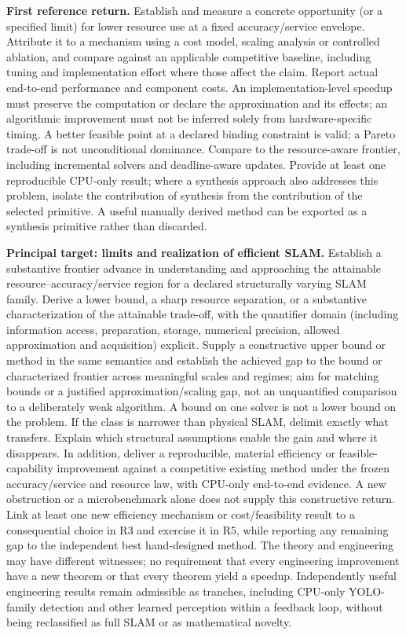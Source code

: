 \documentclass[11pt,letterpaper]{article}
\begin{document}
\textbf{First reference return.} Establish and measure a concrete opportunity (or a specified limit) for lower resource use at a fixed accuracy/service envelope. Attribute it to a mechanism using a cost model, scaling analysis or controlled ablation, and compare against an applicable competitive baseline, including tuning and implementation effort where those affect the claim. Report actual end-to-end performance and component costs. An implementation-level speedup must preserve the computation or declare the approximation and its effects; an algorithmic improvement must not be inferred solely from hardware-specific timing. A better feasible point at a declared binding constraint is valid; a Pareto trade-off is not unconditional dominance. Compare to the resource-aware frontier, including incremental solvers and deadline-aware updates. Provide at least one reproducible CPU-only result; where a synthesis approach also addresses this problem, isolate the contribution of synthesis from the contribution of the selected primitive. A useful manually derived method can be exported as a synthesis primitive rather than discarded.

\textbf{Principal target: limits and realization of efficient SLAM.} Establish a substantive frontier advance in understanding and approaching the attainable resource--accuracy/service region for a declared structurally varying SLAM family. Derive a lower bound, a sharp resource separation, or a substantive characterization of the attainable trade-off, with the quantifier domain (including information access, preparation, storage, numerical precision, allowed approximation and acquisition) explicit. Supply a constructive upper bound or method in the same semantics and establish the achieved gap to the bound or characterized frontier across meaningful scales and regimes; aim for matching bounds or a justified approximation/scaling gap, not an unquantified comparison to a deliberately weak algorithm. A bound on one solver is not a lower bound on the problem. If the class is narrower than physical SLAM, delimit exactly what transfers. Explain which structural assumptions enable the gain and where it disappears. In addition, deliver a reproducible, material efficiency or feasible-capability improvement against a competitive existing method under the frozen accuracy/service and resource law, with CPU-only end-to-end evidence. A new obstruction or a microbenchmark alone does not supply this constructive return. Link at least one new efficiency mechanism or cost/feasibility result to a consequential choice in R3 and exercise it in R5, while reporting any remaining gap to the independent best hand-designed method. The theory and engineering may have different witnesses; no requirement that every engineering improvement have a new theorem or that every theorem yield a speedup. Independently useful engineering results remain admissible as tranches, including CPU-only YOLO-family detection and other learned perception within a feedback loop, without being reclassified as full SLAM or as mathematical novelty.
\end{document}
